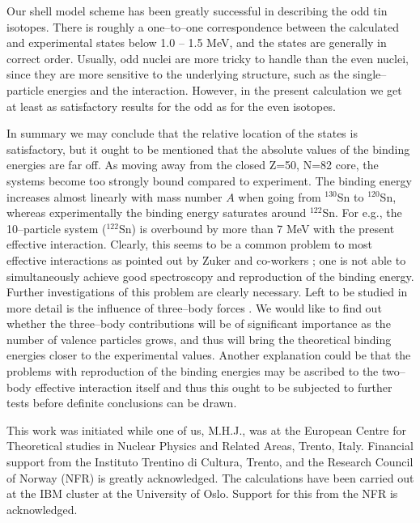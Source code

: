 Our shell model scheme has been greatly successful in describing 
the odd tin isotopes. There is roughly a one--to--one 
correspondence between the calculated and experimental states below 
1.0 -- 1.5 MeV, and the states are generally in correct order. 
Usually, odd nuclei are more tricky to handle than the even nuclei, since 
they are more sensitive to the underlying structure, such as the 
single--particle energies and the interaction. However, in the present 
calculation we get at least as satisfactory results for the odd as 
for the even isotopes.

In summary we may conclude that the relative location of the states is
satisfactory, but it ought to be mentioned that the absolute values of the
binding  energies are far off. As moving away from the closed Z=50, 
N=82 core, the systems become too strongly bound compared to experiment.
The binding energy increases almost linearly with mass number $A$ when
going from $^{130}$Sn to $^{120}$Sn, 
whereas experimentally the binding energy saturates around $^{122}$Sn.
For e.g., the 10--particle system ($^{122}$Sn) is overbound by 
more than 7 MeV with the present effective interaction. Clearly, this 
seems to be a common problem to most effective interactions as pointed
out by Zuker and co-workers \cite{andres}; one is not able to 
simultaneously achieve good spectroscopy and reproduction of the 
binding energy. 
Further investigations of this problem are clearly necessary. 
Left to be studied 
in more detail is the influence of three--body forces \cite{eh97}. We 
would like to find out whether the three--body contributions will be of 
significant importance as the number of valence particles grows, and thus 
will bring the theoretical binding energies closer to the experimental 
values. Another explanation could be that the problems with reproduction 
of the binding energies may be ascribed to the two--body effective 
interaction itself and thus this ought to be subjected to further tests 
before definite conclusions can be drawn.

This work was initiated while one of us, M.H.J., was at the
European Centre for Theoretical studies in Nuclear Physics and Related Areas,
Trento, Italy. 
Financial support from the Instituto Trentino di Cultura, 
Trento, and the Research
Council of Norway (NFR) is greatly acknowledged. The calculations have been 
carried out at the IBM cluster at the University of Oslo. Support
for this from the NFR is acknowledged. 

